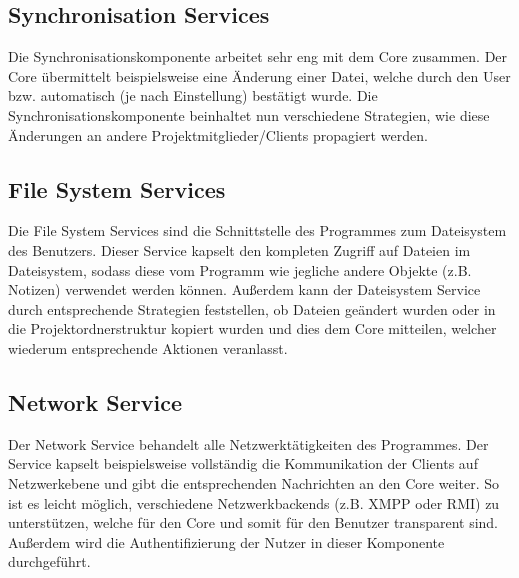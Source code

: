 \subsection{Synchronisation Services}
Die Synchronisationskomponente arbeitet sehr eng mit dem Core zusammen. Der Core übermittelt beispielsweise
eine Änderung einer Datei, welche durch den User bzw. automatisch (je nach Einstellung) bestätigt wurde.
Die Synchronisationskomponente beinhaltet nun verschiedene Strategien, wie diese Änderungen an andere
Projektmitglieder/Clients propagiert werden. 

\subsection{File System Services}
Die File System Services sind die Schnittstelle des Programmes zum Dateisystem des Benutzers. Dieser
Service kapselt den kompleten Zugriff auf Dateien im Dateisystem, sodass diese vom Programm wie jegliche
andere Objekte (z.B. Notizen) verwendet werden können. Außerdem kann der Dateisystem Service durch
entsprechende Strategien feststellen, ob Dateien geändert wurden oder in die Projektordnerstruktur
kopiert wurden und dies dem Core mitteilen, welcher wiederum entsprechende Aktionen veranlasst.

\subsection{Network Service}
Der Network Service behandelt alle Netzwerktätigkeiten des Programmes. Der Service kapselt beispielsweise
vollständig die Kommunikation der Clients auf Netzwerkebene und gibt die entsprechenden Nachrichten an
den Core weiter. So ist es leicht möglich, verschiedene Netzwerkbackends (z.B. XMPP oder RMI) zu unterstützen,
welche für den Core und somit für den Benutzer transparent sind. Außerdem wird die Authentifizierung der
Nutzer in dieser Komponente durchgeführt.

